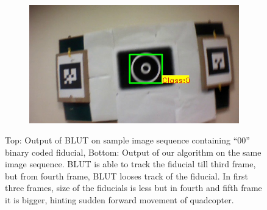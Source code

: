 \documentclass[runningheads]{llncs}
\begin{document}
\begin{figure}
\begin{subfigure}[b]{.19\textwidth}
\end{subfigure}
\begin{subfigure}[b]{.19\textwidth}
\includegraphics[width=\linewidth]{BLUT_input_00/output6.jpg}
\end{subfigure}
\caption{Top: Output of BLUT\cite{Wu:2011} on sample image sequence containing ``00''
binary coded fiducial, Bottom: Output of our algorithm on the same image
sequence. BLUT is able to track the fiducial till third frame, but from fourth
frame, BLUT looses track of the fiducial. In first three frames, size of the
fiducials is less but in fourth and fifth frame it is bigger, hinting sudden
forward movement of quadcopter.}
\label{fig:BLUT_compare_00}
\end{figure}
\end{document}
